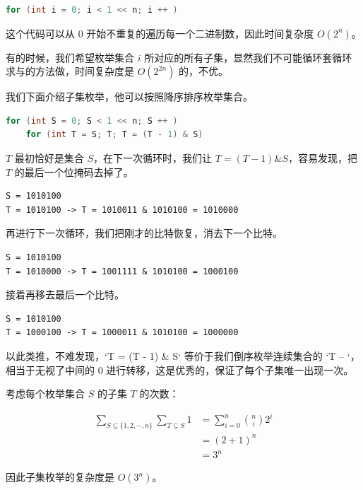 
\begin{lstlisting}[language=C++, basicstyle=\ttfamily\small]
for (int i = 0; i < 1 << n; i ++ )
\end{lstlisting}

这个代码可以从 $0$ 开始不重复的遍历每一个二进制数，因此时间复杂度 $O(2^n)$。


有的时候，我们希望枚举集合 $i$ 所对应的所有子集，显然我们不可能循环套循环求与的方法做，时间复杂度是 $O(2^{2n})$ 的，不优。

我们下面介绍子集枚举，他可以按照降序排序枚举集合。

\begin{lstlisting}[language=C++, basicstyle=\ttfamily\small]
for (int S = 0; S < 1 << n; S ++ )
    for (int T = S; T; T = (T - 1) & S)
\end{lstlisting}

$T$ 最初恰好是集合 $S$，在下一次循环时，我们让 $T = (T - 1) \& S$，容易发现，把 $T$ 的最后一个位掩码去掉了。

\begin{verbatim}
S = 1010100
T = 1010100 -> T = 1010011 & 1010100 = 1010000
\end{verbatim}

再进行下一次循环，我们把刚才的比特恢复，消去下一个比特。

\begin{verbatim}
S = 1010100
T = 1010000 -> T = 1001111 & 1010100 = 1000100
\end{verbatim}

接着再移去最后一个比特。

\begin{verbatim}
S = 1010100
T = 1000100 -> T = 1000011 & 1010100 = 1000000
\end{verbatim}

以此类推，不难发现，`T = (T - 1) \& S` 等价于我们倒序枚举连续集合的 `T -- `，相当于无视了中间的 $0$ 进行转移，这是优秀的，保证了每个子集唯一出现一次。

考虑每个枚举集合 $S$ 的子集 $T$ 的次数：

\[
\begin{aligned}
\sum_{S \subseteq \{1, 2, \cdots, n\}}\sum_{T \subseteq S}1 &= \sum_{i = 0}^n\binom{n}{i}2^i \\
&= (2 + 1)^n \\
&= 3^n
\end{aligned}
\]

因此子集枚举的复杂度是 $O(3^n)$。